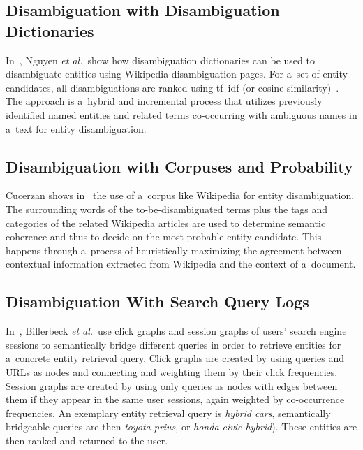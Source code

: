 \subsection{Disambiguation with Disambiguation Dictionaries}

In~\cite{nguyen2008namedentity},
Nguyen \emph{et al.}\ show how disambiguation dictionaries
can be used to disambiguate entities
using Wikipedia disambiguation pages.
For a~set of entity candidates, all disambiguations are ranked
using tf--idf (or cosine similarity)~\cite{manning2008ir}.
The approach is a~hybrid and incremental process
that utilizes previously identified named entities
and related terms co-occurring with ambiguous names
in a~text for entity disambiguation.

\subsection{Disambiguation with Corpuses and Probability}

Cucerzan shows in~\cite{cucerzan2007largescale}
the use of a~corpus like Wikipedia for entity disambiguation.
The surrounding words of the to-be-disambiguated terms
plus the tags and categories of the related Wikipedia articles
are used to determine semantic coherence and thus
to decide on the most probable entity candidate.
This happens through a~process of heuristically maximizing
the agreement between contextual information
extracted from Wikipedia and the context of a~document.

\subsection{Disambiguation With Search Query Logs}

In~\cite{billerbeck2010rankingentities}, Billerbeck \emph{et al.}\
use click graphs and session graphs
of users' search engine sessions
to semantically bridge different queries in order to
retrieve entities for a~concrete entity retrieval query.
Click graphs are created by using queries and URLs as nodes
and connecting and weighting them by their click frequencies.
Session graphs are created by using only queries as nodes
with edges between them if they appear in the same user sessions,
again weighted by co-occurrence frequencies.
An exemplary entity retrieval query is \emph{hybrid cars},
semantically bridgeable queries are then \emph{toyota prius},
or \emph{honda civic hybrid}).
These entities are then ranked and returned to the user.

